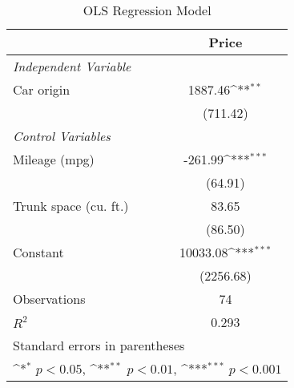 \begin{table}[htbp]\centering
\def\sym#1{\ifmmode^{#1}\else\(^{#1}\)\fi}
\caption{\centering OLS Regression Model}
\begin{tabular}{l*{1}{c}}
\toprule
                &\multicolumn{1}{c}{\hspace{0.25cm} Price}\\
\midrule
\emph{Independent Variable}&                  \\
\addlinespace
\hspace{0.25cm} Car origin&  1887.46\sym{**} \\
                & (711.42)         \\
\addlinespace
\vspace{0.1em} \emph{Control Variables}&                  \\
\addlinespace
\hspace{0.25cm} Mileage (mpg)&  -261.99\sym{***}\\
                &  (64.91)         \\
\addlinespace
\hspace{0.25cm} Trunk space (cu. ft.)&    83.65         \\
                &  (86.50)         \\
\addlinespace
Constant        & 10033.08\sym{***}\\
                &(2256.68)         \\
\midrule
Observations    &       74         \\
\(R^{2}\)       &    0.293         \\
\bottomrule
\multicolumn{2}{l}{\footnotesize Standard errors in parentheses}\\
\multicolumn{2}{l}{\footnotesize \sym{*} \(p<0.05\), \sym{**} \(p<0.01\), \sym{***} \(p<0.001\)}\\
\end{tabular}
\end{table}
